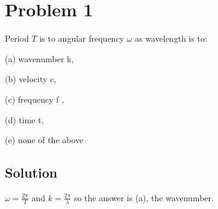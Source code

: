 \section*{Problem 1}
Period $T$ is to angular frequency $\omega$ as wavelength is to: 

(a) wavenumber k, 

(b) velocity c, 

(c) frequency f , 

(d) time t, 

(e) none of the above

\subsection*{Solution}

$\omega = \frac{2\pi}{T}$ and $k = \frac{2\pi}{\lambda}$ so the answer is (a), the wavenumber.